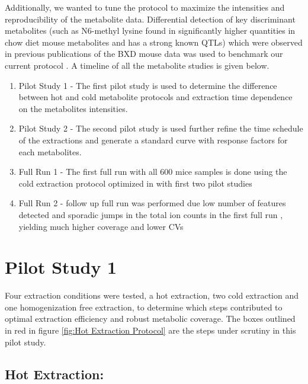 \documentclass[a4paper,11pt,twoside]{book}
\begin{document}
    Additionally, we wanted to tune the protocol to maximize the intensities and reproducibility of the metabolite data. Differential detection of key discriminant metabolites (such as N6-methyl lysine found in significantly higher quantities in chow diet mouse metabolites and has a strong known QTLs) which were observed in previous publications of the BXD mouse data was used to benchmark our current protocol \citep{Williams2016SystemsFunction,Wu2014MultilayeredPopulation}.  A timeline of all the metabolite studies is given below.
	
	\begin{enumerate}
		\item Pilot Study 1 - The first pilot study is used to determine the difference between hot and cold metabolite protocols and extraction time dependence on the metabolites intensities.
		\item Pilot Study 2 - The second pilot study is used further refine the time schedule of the extractions and generate a standard curve with response factors for each metabolites. 
		\item Full Run 1 - The first full run with all 600 mice samples is done using the cold extraction protocol optimized in with first two pilot studies 
		\item Full Run 2 - follow up full run was performed due low number of features detected and sporadic jumps in the total ion counts in the first full run , yielding much higher coverage and lower CVs 
	\end{enumerate}
	
	\section{Pilot Study 1}
	
	Four extraction conditions were tested, a hot extraction, two cold extraction and one homogenization free extraction, to determine which steps contributed to optimal extraction efficiency and robust metabolic coverage. The boxes outlined in red in figure \ref{fig:Hot Extraction Protocol} are the steps under scrutiny in this pilot study.
		
	\subsection*{Hot Extraction:}
	
\end{document}
